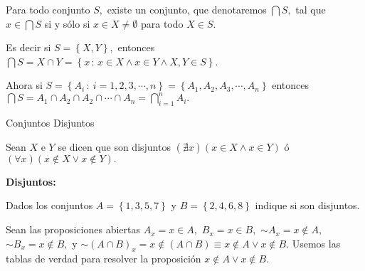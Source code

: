 Para todo conjunto $S,$ existe un conjunto, que denotaremos $\bigcap S,$
tal que $x\in\bigcap S$ si y sólo si $x\in X\neq\emptyset$ para
todo $X\in S.$

Es decir si $S=\left\{ X,Y\right\} ,$ entonces $\bigcap S=X\cap Y=\left\{ x\,:\,x\in X\wedge x\in Y\wedge X,Y\in S\right\} $.

Ahora si $S=\left\{ A_{i}\,:\:i=1,2,3,\cdots,n\right\} =\left\{ A_{1},A_{2},A_{3},\cdots,A_{n}\right\} $
entonces $\bigcap S=A_{1}\cap A_{2}\cap A_{2}\cap\cdots\cap A_{n}={\displaystyle \bigcap_{i=1}^{n}A_{i}}.$

\begin{defi}{Conjuntos Disjuntos}{}

Sean $X$ e $Y$ se dicen que son disjuntos $\left(\nexists x\right)\left(x\in X\wedge x\in Y\right)$
ó $\left(\forall x\right)\left(x\notin X\vee x\notin Y\right).$

\end{defi}

\begin{ejemplo}{\bf Disjuntos:}

Dados los conjuntos $A=\left\{ 1,3,5,7\right\} $ y $B=\left\{ 2,4,6,8\right\} $
indique si son disjuntos.

\end{ejemplo}

\solu Sean las proposiciones abiertas $A_{x}=x\in A,$ $B_{x}=x\in B,$
$\sim A_{x}=x\notin A,$ $\sim B_{x}=x\notin B,$ y $\sim\left(A\cap B\right)_{x}=x\notin\left(A\cap B\right)\equiv x\notin A\vee x\notin B.$
Usemos las tablas de verdad para resolver la proposición $x\notin A\vee x\notin B.$

